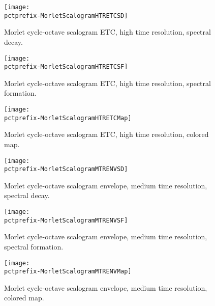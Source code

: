 \documentclass[a4paper,titlepage]{article}
\newcommand{\pctprefix}{T}
\newcommand{\pctwidth}{1.0}
\begin{document}
\begin{figure}
\begin{center}
\texttt{[image: \\pctprefix-MorletScalogramHTRETCSD]}
\caption{Morlet cycle-octave scalogram ETC, high time resolution, spectral decay.}
\end{center}
\end{figure}

\begin{figure}
\begin{center}
\texttt{[image: \\pctprefix-MorletScalogramHTRETCSF]}
\caption{Morlet cycle-octave scalogram ETC, high time resolution, spectral formation.}
\end{center}
\end{figure}

\begin{figure}
\begin{center}
\texttt{[image: \\pctprefix-MorletScalogramHTRETCMap]}
\caption{Morlet cycle-octave scalogram ETC, high time resolution, colored map.}
\end{center}
\end{figure}

\clearpage
\begin{figure}
\begin{center}
\texttt{[image: \\pctprefix-MorletScalogramMTRENVSD]}
\caption{Morlet cycle-octave scalogram envelope, medium time resolution, spectral decay.}
\end{center}
\end{figure}

\begin{figure}
\begin{center}
\texttt{[image: \\pctprefix-MorletScalogramMTRENVSF]}
\caption{Morlet cycle-octave scalogram envelope, medium time resolution, spectral formation.}
\end{center}
\end{figure}

\begin{figure}
\begin{center}
\texttt{[image: \\pctprefix-MorletScalogramMTRENVMap]}
\caption{Morlet cycle-octave scalogram envelope, medium time resolution, colored map.}
\end{center}
\end{figure}
\end{document}
